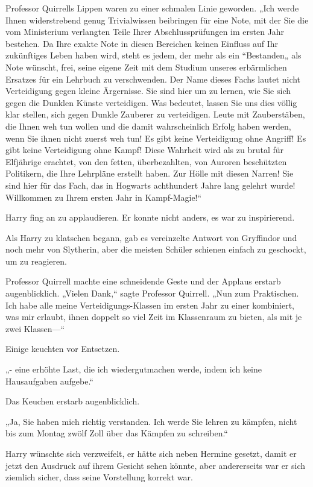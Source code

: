{Professor Quirrells Lippen waren zu einer schmalen Linie geworden. „Ich werde Ihnen widerstrebend genug Trivialwissen beibringen für eine Note, mit der Sie die vom Ministerium verlangten Teile Ihrer Abschlussprüfungen im ersten Jahr bestehen. Da Ihre exakte Note in diesen Bereichen keinen Einfluss auf Ihr zukünftiges Leben haben wird, steht es jedem, der mehr als ein “Bestanden„ als Note wünscht, frei, seine eigene Zeit mit dem Studium unseres erbärmlichen Ersatzes für ein Lehrbuch zu verschwenden. Der Name dieses Fachs lautet nicht Verteidigung gegen kleine Ärgernisse. Sie sind hier um zu lernen, wie Sie sich gegen die Dunklen Künste verteidigen. Was bedeutet, lassen Sie uns dies völlig klar stellen, sich gegen Dunkle Zauberer zu verteidigen. Leute mit Zauberstäben, die Ihnen weh tun wollen und die damit wahrscheinlich Erfolg haben werden, wenn Sie ihnen nicht zuerst weh tun! Es gibt keine Verteidigung ohne Angriff! Es gibt keine Verteidigung ohne Kampf! Diese Wahrheit wird als zu brutal für Elfjährige erachtet, von den fetten, überbezahlten, von Auroren beschützten Politikern, die Ihre Lehrpläne erstellt haben. Zur Hölle mit diesen Narren! Sie sind hier für das Fach, das in Hogwarts achthundert Jahre lang gelehrt wurde! Willkommen zu Ihrem ersten Jahr in Kampf-Magie!“

Harry fing an zu applaudieren. Er konnte nicht anders, es war zu inspirierend.

Als Harry zu klatschen begann, gab es vereinzelte Antwort von Gryffindor und noch mehr von Slytherin, aber die meisten Schüler schienen einfach zu geschockt, um zu reagieren.

Professor Quirrell machte eine schneidende Geste und der Applaus erstarb augenblicklich. „Vielen Dank,“ sagte Professor Quirrell. „Nun zum Praktischen. Ich habe alle meine Verteidigungs-Klassen im ersten Jahr zu einer kombiniert, was mir erlaubt, ihnen doppelt so viel Zeit im Klassenraum zu bieten, als mit je zwei Klassen—“

Einige keuchten vor Entsetzen.

„- eine erhöhte Last, die ich wiedergutmachen werde, indem ich keine Hausaufgaben aufgebe.“

Das Keuchen erstarb augenblicklich.

„Ja, Sie haben mich richtig verstanden. Ich werde Sie lehren zu kämpfen, nicht bis zum Montag zwölf Zoll über das Kämpfen zu schreiben.“

Harry wünschte sich verzweifelt, er hätte sich neben Hermine gesetzt, damit er jetzt den Ausdruck auf ihrem Gesicht sehen könnte, aber andererseits war er sich ziemlich sicher, dass seine Vorstellung korrekt war.

}
